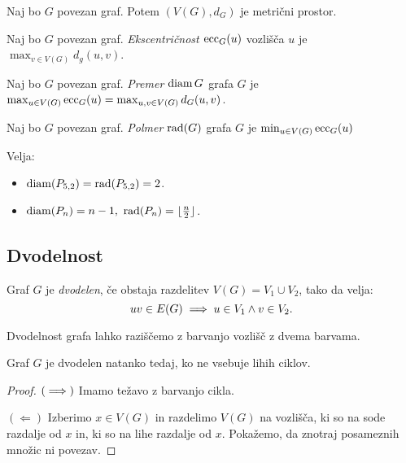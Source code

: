 \begin{trditev}
    Naj bo $G$ povezan graf. Potem $(V(G), d_G)$ je metrični prostor.
\end{trditev}

\begin{definicija}
    Naj bo $G$ povezan graf. \emph{Ekscentričnost $\operatorname{ecc}_G(u)$} vozlišča $u$ je $\max_{v \in V(G)} d_g(u,v)$.
\end{definicija}

\begin{definicija}
    Naj bo $G$ povezan graf. \emph{Premer $\operatorname{diam} G$} grafa $G$ je $\max_{u \in V(G)} \operatorname{ecc}_G(u) = \max_{u,v \in V(G)} d_G(u,v)$.
\end{definicija}

\begin{definicija}
    Naj bo $G$ povezan graf. \emph{Polmer $\operatorname{rad}(G)$} grafa $G$ je $\min_{u \in V(G)} \operatorname{ecc}_G(u)$
\end{definicija}

\begin{primer}
    Velja:
    \begin{itemize}
        \item $\operatorname{diam}(P_{5,2}) = \operatorname{rad}(P_{5,2}) = 2$.
        \item $\operatorname{diam}(P_n) = n-1, \ \operatorname{rad}(P_n) = \lfloor \frac{n}{2} \rfloor$.
    \end{itemize} 
\end{primer}

\subsection{Dvodelnost}
\begin{definicija}
    Graf $G$ je \emph{dvodelen}, če obstaja razdelitev $V(G) = V_1 \cup V_2$, tako da velja: $$uv \in E(G) \implies u \in V_1 \land v \in V_2.$$
\end{definicija}

\begin{primer}
    Dvodelnost grafa lahko raziščemo z barvanjo vozlišč z dvema barvama.
\end{primer}

\begin{izrek}
    Graf $G$ je dvodelen natanko tedaj, ko ne vsebuje lihih ciklov.
\end{izrek}

\begin{proof}
    $(\implies)$ Imamo težavo z barvanjo cikla.
    
    $(\Leftarrow)$ Izberimo $x \in V(G)$ in razdelimo $V(G)$ na vozlišča, ki so na sode razdalje od $x$ in, ki so na lihe razdalje od $x$. Pokažemo, da znotraj posameznih množic ni povezav.
\end{proof}

